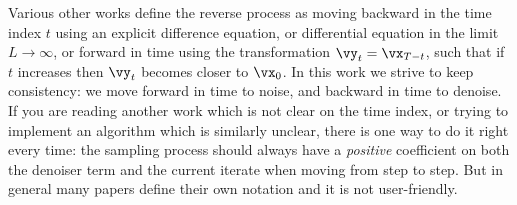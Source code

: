 \documentclass[../../book-main.tex]{subfiles}
\begin{document}
\begin{remark}
	Various other works define the reverse process as moving backward in the time index \(t\) using an explicit difference equation, or differential equation in the limit \(L \to \infty\), or forward in time using the transformation \(\vy_{t} = \vx_{T - t}\), such that if \(t\) increases then \(\vy_{t}\) becomes closer to \(\vx_{0}\). In this work we strive to keep consistency: we move forward in time to noise, and backward in time to denoise. If you are reading another work which is not clear on the time index, or trying to implement an algorithm which is similarly unclear, there is one way to do it right every time: the sampling process should always have a \textit{positive} coefficient on both the denoiser term and the current iterate when moving from step to step. But in general many papers define their own notation and it is not user-friendly.
\end{remark}
\end{document}
